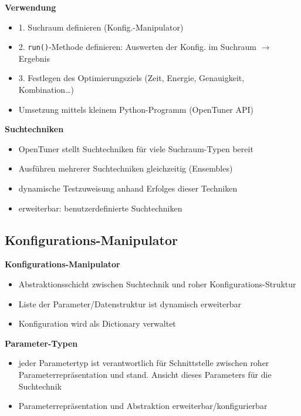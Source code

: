   \begin{frame}
  \textbf{Verwendung}
  \begin{itemize}
    \item 1. Suchraum definieren (Konfig.-Manipulator)
    \item 2. \texttt{run()}-Methode definieren: Auswerten der Konfig. im Suchraum $\rightarrow$ Ergebnis
    \item 3. Festlegen des Optimierungsziels (Zeit, Energie, Genauigkeit, Kombination…)
    \item Umsetzung mittels kleinem Python-Programm (OpenTuner API)
  \end{itemize}
  \textbf{Suchtechniken}
  \begin{itemize}
    \item OpenTuner stellt Suchtechniken für viele Suchraum-Typen bereit
    \item Ausführen mehrerer Suchtechniken gleichzeitig (Ensembles)
    \item dynamische Testzuweisung anhand Erfolges dieser Techniken
    \item erweiterbar: benutzerdefinierte Suchtechniken
  \end{itemize}
  \end{frame}
  

  \subsection{Konfigurations-Manipulator}

  \begin{frame}
  \textbf{Konfigurations-Manipulator}
  \begin{itemize}
    \item Abstraktionsschicht zwischen Suchtechnik und roher Konfigurations-Struktur
    \item Liste der Parameter/Datenstruktur ist dynamisch erweiterbar
    \item Konfiguration wird als Dictionary verwaltet \newline
  \end{itemize}
  \textbf{Parameter-Typen}
  \begin{itemize}
    \item jeder Parametertyp ist verantwortlich für Schnittstelle zwischen roher 
    Parameterrepräsentation und stand. Ansicht dieses Parameters für die Suchtechnik
    \item Parameterrepräsentation und Abstraktion erweiterbar/konfigurierbar
  \end{itemize}
  \end{frame}
  
